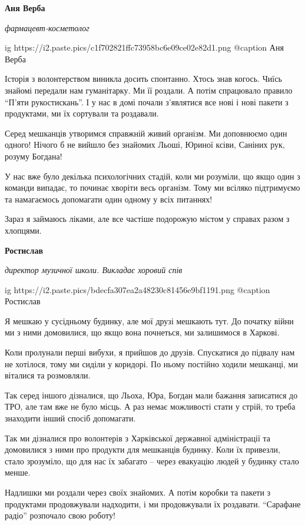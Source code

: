 \raggedcolumns
\begin{multicols}{3} %
\setlength{\parindent}{0pt}

\textbf{Аня Верба}

\emph{фармацевт-косметолог}

\ifcmt
  ig https://i2.paste.pics/c1f702821ffc73958bc6e09ce02e82d1.png
	@caption Аня Верба
\fi

Історія з волонтерством виникла досить спонтанно. Хтось знав когось. Чиїсь
знайомі передали нам гуманітарку. Ми її роздали. А потім спрацювало правило
\enquote{П'яти рукостискань}. І у нас в домі почали з'являтися все нові і нові пакети з
продуктами, ми їх сортували та роздавали.

Серед мешканців утворимся справжній живий організм. Ми доповнюємо один одного!
Нічого б не вийшло без знайомих Льоші, Юриної ксіви, Саніних рук, розуму
Богдана!

У нас вже було декілька психологічних стадій, коли ми розуміли, що якщо один з
команди випадає, то починає хворіти весь організм. Тому ми всіляко підтримуємо
та намагаємось допомагати один одному у всіх питаннях!

Зараз я займаюсь ліками, але все частіше подорожую містом у справах разом з
хлопцями.

\textbf{Ростислав}

\emph{директор музичної школи. Викладає хоровий спів}

\ifcmt
  ig https://i2.paste.pics/bdecfa307ea2a48230c81456e9bf1191.png
	@caption Ростислав
\fi

Я мешкаю у сусідньому будинку, але мої друзі мешкають тут. До початку війни ми
з ними домовилися, що якщо вона почнеться, ми залишимося в Харкові.

Коли пролунали перші вибухи, я прийшов до друзів. Спускатися до підвалу нам не
хотілося, тому ми сиділи у коридорі. По ньому постійно ходили мешканці, ми
віталися та розмовляли.

Так серед іншого дізналися, що Льоха, Юра, Богдан мали бажання записатися до
ТРО, але там вже не було місць. А раз немає можливості стати у стрій, то треба
знаходити інший спосіб допомагати.

Так ми дізналися про волонтерів з Харківської державної адміністрації та
домовилися з ними про продукти для мешканців будинку. Коли їх привезли, стало
зрозуміло, що для нас їх забагато – через евакуацію людей у будинку стало
менше.

Надлишки ми роздали через своїх знайомих. А потім коробки та пакети з
продуктами продовжували надходити, і ми продовжували їх роздавати. \enquote{Сарафане
радіо} розпочало свою роботу!


\end{multicols}
